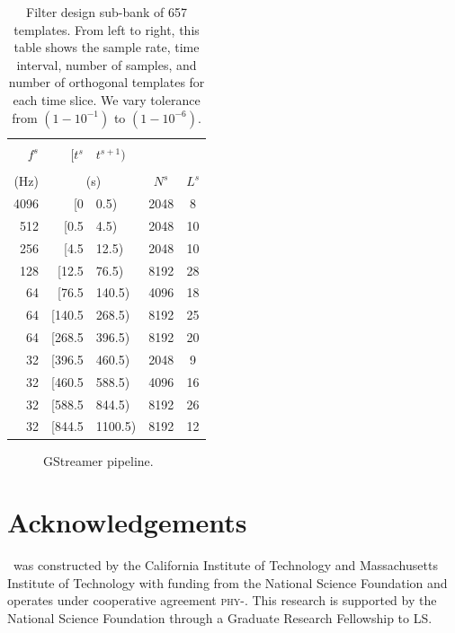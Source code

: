 \documentclass[portrait,plainboxedsections]{sciposter}
\begin{document}
\begin{minipage}[t]{0.25\textwidth}
\begin{table}
\begin{tabular}{rr@{,\,}lcc}
\toprule
\\ [-2ex]
$f^s$ & $[t^s$&$t^{s+1})$ & & \\%
\\[-2.5ex]
(Hz) & \multicolumn{2}{c}{(s)} & $N^s$ & $L^s$ \\ \midrule
4096 & [0&0.5) & 2048 & 8 \\
512 & [0.5&4.5) & 2048 & 10 \\
256 & [4.5&12.5) & 2048 & 10 \\
128 & [12.5&76.5) & 8192 & 28 \\
64 & [76.5&140.5) & 4096 & 18 \\
64 & [140.5&268.5) & 8192 & 25 \\
64 & [268.5&396.5) & 8192 & 20 \\
32 & [396.5&460.5) & 2048 & 9 \\
32 & [460.5&588.5) & 4096 & 16 \\
32 & [588.5&844.5) & 8192 & 26 \\
32 & [844.5&1100.5) & 8192 & 12 \\
\bottomrule
\end{tabular}
\caption{\label{tab:time_slices} Filter design sub-bank of 657 templates.  From left to right, this table shows the sample rate, time interval, number of samples, and number of orthogonal templates for each time slice.  We vary \SVD{} tolerance from $\left(1-10^{-1}\right)$ to $\left(1-10^{-6}\right)$.}
\end{table}


\begin{figure}
\centering
\caption{GStreamer pipeline.}
\label{f:gstreamer_pipeline}
\end{figure}

\end{minipage}

\section*{Acknowledgements}

\LIGO\ was constructed by the California Institute of Technology and
Massachusetts Institute of Technology with funding from the National Science
Foundation and operates under cooperative agreement
\textsc{phy}-. This research
is supported by the National Science Foundation through a Graduate Research
Fellowship to LS.




\end{document}
